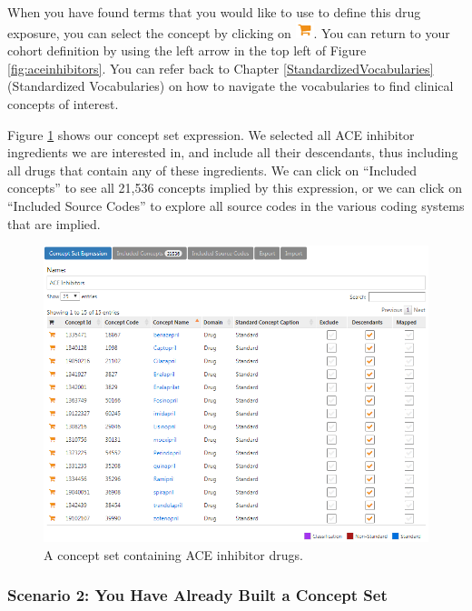 \documentclass[11pt]{book}
\theoremstyle{definition}
\theoremstyle{definition}
\theoremstyle{definition}
\theoremstyle{remark}
\begin{document}
When you have found terms that you would like to use to define this drug
exposure, you can select the concept by clicking on
\includegraphics{images/Cohorts/shoppingcart.png}. You can return to
your cohort definition by using the left arrow in the top left of Figure
\ref{fig:aceinhibitors}. You can refer back to Chapter
\ref{StandardizedVocabularies} (Standardized Vocabularies) on how to
navigate the vocabularies to find clinical concepts of interest.

Figure \ref{fig:aceConceptSetExpression} shows our concept set
expression. We selected all ACE inhibitor ingredients we are interested
in, and include all their descendants, thus including all drugs that
contain any of these ingredients. We can click on ``Included concepts''
to see all 21,536 concepts implied by this expression, or we can click
on ``Included Source Codes'' to explore all source codes in the various
coding systems that are implied.

\begin{figure}

{\centering \includegraphics[width=1\linewidth]{images/Cohorts/aceConceptSetExpression} 

}

\caption{A concept set containing ACE inhibitor drugs.}\label{fig:aceConceptSetExpression}
\end{figure}

\subsubsection*{Scenario 2: You Have Already Built a Concept
Set}\label{scenario-2-you-have-already-built-a-concept-set}
\end{document}
